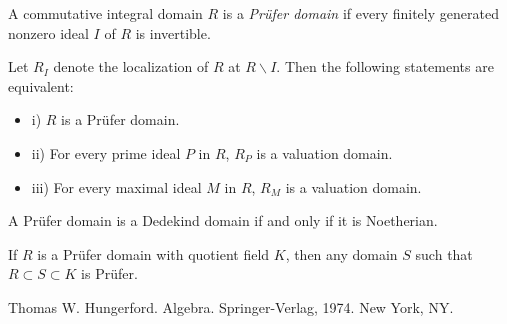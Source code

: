\documentclass[12pt]{article}
\newcommand{\<}{\langle}
\renewcommand{\>}{\rangle}
\begin{document}
A commutative integral domain $R$ is a \emph{Pr\"ufer domain} if every finitely generated nonzero ideal $I$ of $R$ is invertible.

Let $R_I$ denote the localization of $R$ at $R\backslash I$.  Then the following statements are equivalent:
\begin{itemize}
\item i)  $R$ is a Pr\"ufer domain.
\item ii)  For every prime ideal $P$ in $R$, $R_P$ is a valuation domain.
\item iii)  For every maximal ideal $M$ in $R$, $R_M$ is a valuation domain.
\end{itemize}

A Pr\"ufer domain is a Dedekind domain if and only if it is Noetherian.

If $R$ is a Pr\"ufer domain with quotient field $K$, then any domain $S$ such that $R\subset S\subset K$ is Pr\"ufer.

\begin{thebibliography}{9}
 Thomas W. Hungerford.  Algebra.  Springer-Verlag, 1974.  New York, NY.
\end{thebibliography}
\end{document}
